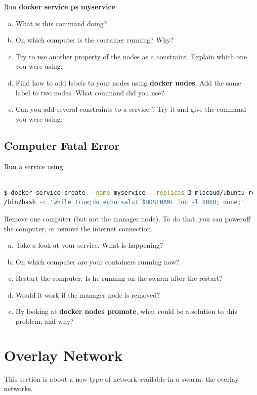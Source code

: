 \documentclass[a4paper,11pt]{exam}
\begin{document}
\begin{questions}
	\question Run \textbf{docker service ps myservice}
	\begin{enumerate}[(a)]
		\item What is this command doing?
		\item On which computer is the container running? Why?
		\item Try to use another property of the nodes as a constraint. Explain which one you were using.
		\item Find how to add labels to your nodes using \textbf{docker nodes}. Add the same label to two nodes. What command did you use?
		\item Can you add several constraints to a service ? Try it and give the command you were using.
	\end{enumerate}
\end{questions}

\subsection{Computer Fatal Error}
Run a service using:
\begin{lstlisting}[frame=single,language={sh}]  % Start your code-block

$ docker service create --name myservice --replicas 3 mlacaud/ubuntu_re355 \
/bin/bash -c 'while true;do echo salut $HOSTNAME |nc -l 8080; done;'

\end{lstlisting}
\begin{questions}
	\question Remove one computer (but not the manager node). To do that, you can poweroff the computer, or remove the internet connection.
	\begin{enumerate}[(a)]
		\item Take a look at your service. What is happening?
		\item On which computer are your containers running now?
		\item Restart the computer. Is he running on the swarm after the restart?
		\item Would it work if the manager node is removed?
		\item By looking at \textbf{docker nodes promote}, what could be a solution to this problem, and why?
	\end{enumerate}
\end{questions}
 
\section{Overlay Network} 
This section is about a new type of network available in a swarm: the overlay networks. 
\end{document}
